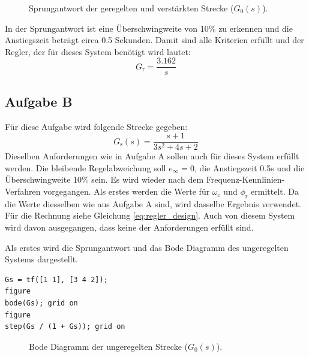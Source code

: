 \documentclass[11pt,a4paper]{article}
\newlength\figureheight
\newlength\figurewidth
\begin{document}
\begin{figure}[H]
    \centering
    \setlength\figureheight{6cm}
    \setlength{} %
    
    
    
    \caption{Sprungantwort der geregelten und verstärkten Strecke ($G_{\mathrm{0}}(s)$).}
    \label{fig:matlab_plot5}
\end{figure}

\noindent In der Sprungantwort ist eine Überschwingweite von 10\% zu erkennen und die Anstiegszeit beträgt circa 0.5 Sekunden. Damit sind alle Kriterien erfüllt und der Regler, der für dieses System benötigt wird lautet:
$$G_{\mathrm{r}} = \frac{3.162}{s}$$

\subsection{Aufgabe B}

Für diese Aufgabe wird folgende Strecke gegeben:
$$G_{\mathrm{s}}(s) = \frac{s+1}{3s^2 + 4s + 2}$$
Dieselben Anforderungen wie in Aufgabe A sollen auch für dieses System erfüllt werden. Die bleibende Regelabweichung soll $e_{\mathrm{\infty}} = 0$, die Anstiegszeit 0.5s und die Überschwingweite 10\% sein. Es wird wieder nach dem Frequenz-Kennlinien-Verfahren vorgegangen. Als erstes werden die Werte für $\omega_{\mathrm{c}}$ und $\phi_{\mathrm{r}}$ ermittelt. Da die Werte diesselben wie aus Aufgabe A sind, wird dasselbe Ergebnis verwendet. Für die Rechnung siehe Gleichung \eqref{eq:regler_design}. Auch von diesem System wird davon ausgegangen, dass keine der Anforderungen erfüllt sind.

\noindent Als erstes wird die Sprungantwort und das Bode Diagramm des ungeregelten Systems dargestellt.

\begin{lstlisting}
Gs = tf([1 1], [3 4 2]);
figure
bode(Gs); grid on
figure
step(Gs / (1 + Gs)); grid on
\end{lstlisting}

\begin{figure}[H]
    \centering
    \setlength\figureheight{6cm}
    \setlength{} %
    
    
    
    \caption{Bode Diagramm der ungeregelten Strecke ($G_{\mathrm{0}}(s)$).}
    \label{fig:matlab_plot6}
\end{figure}
\end{document}
